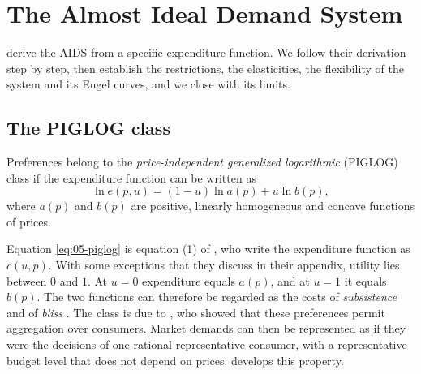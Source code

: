 \section{The Almost Ideal Demand System}\label{sec:05-aids}

\citet{DeatonMuellbauer1980a} derive the AIDS from a specific expenditure function. We follow their
derivation step by step, then establish the restrictions, the elasticities, the flexibility of the system and
its Engel curves, and we close with its limits.

\subsection{The PIGLOG class}\label{sec:05-piglog}

\begin{definition}\label{def:05-piglog}
Preferences belong to the \emph{price-independent generalized logarithmic} (PIGLOG) class if the expenditure
function can be written as
\begin{equation}\label{eq:05-piglog}
\ln e(p, u) = (1 - u)\ln a(p) + u\ln b(p),
\end{equation}
where $a(p)$ and $b(p)$ are positive, linearly homogeneous and concave functions of prices.
\end{definition}

Equation \eqref{eq:05-piglog} is equation (1) of \citet[p.~313]{DeatonMuellbauer1980a}, who write the
expenditure function as $c(u, p)$. With some exceptions that they discuss in their appendix, utility lies
between $0$ and $1$. At $u = 0$ expenditure equals $a(p)$, and at $u = 1$ it equals $b(p)$. The two
functions can therefore be regarded as the costs of \emph{subsistence} and of \emph{bliss}
\citep[p.~313]{DeatonMuellbauer1980a}. The class is due to \citet{Muellbauer1975,Muellbauer1976}, who showed
that these preferences permit aggregation over consumers. Market demands can then be represented as if they
were the decisions of one rational representative consumer, with a representative budget level that does not
depend on prices.  develops this property.

